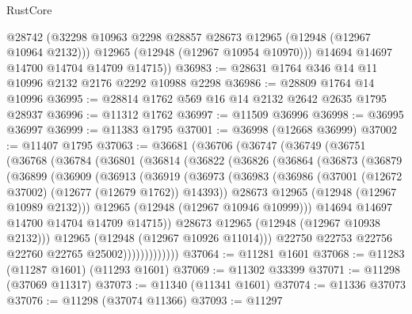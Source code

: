 \begin{lexlean}{RustCore}
\begin{coremodule}
          @28742
          (@32298 @10963 @2298 @28857 @28673 @12965 (@12948 (@12967 @10964 @2132)))
          @12965
          (@12948 (@12967 @10954 @10970)))
        @14694
        @14697
        @14700
        @14704
        @14709
        @14715))
@36983 := @28631 @1764 @346 @14 @11 @10996 @2132 @2176 @2292 @10988 @2298
@36986 := @28809 @1764 @14 @10996
@36995 := @28814 @1762 @569 @16 @14 @2132 @2642 @2635 @1795 @28937
@36996 := @11312 @1762
@36997 := @11509 @36996
@36998 := @36995 @36997
@36999 := @11383 @1795
@37001 := @36998 (@12668 @36999)
@37002 := @11407 @1795
@37063 := @36681
    (@36706
      (@36747
        (@36749
          (@36751
            (@36768
              (@36784
                (@36801
                  (@36814
                    (@36822
                      (@36826
                        (@36864
                          (@36873
                            (@36879
                              (@36899
                                (@36909
                                  (@36913
                                    (@36919
                                      (@36973
                                        (@36983
                                          (@36986
                                            (@37001 (@12672 @37002) (@12677 (@12679 @1762)) @14393))
                                          @28673
                                          @12965
                                          (@12948 (@12967 @10989 @2132)))
                                        @12965
                                        (@12948 (@12967 @10946 @10999)))
                                      @14694
                                      @14697
                                      @14700
                                      @14704
                                      @14709
                                      @14715))
                                  @28673
                                  @12965
                                  (@12948 (@12967 @10938 @2132)))
                                @12965
                                (@12948 (@12967 @10926 @11014)))
                              @22750
                              @22753
                              @22756
                              @22760
                              @22765
                              @25002)))))))))))))
@37064 := @11281 @1601
@37068 := @11283 (@11287 @1601) (@11293 @1601)
@37069 := @11302 @33399
@37071 := @11298 (@37069 @11317)
@37073 := @11340 (@11341 @1601)
@37074 := @11336 @37073
@37076 := @11298 (@37074 @11366)
@37093 := @11297

\end{coremodule}
\end{lexlean}

